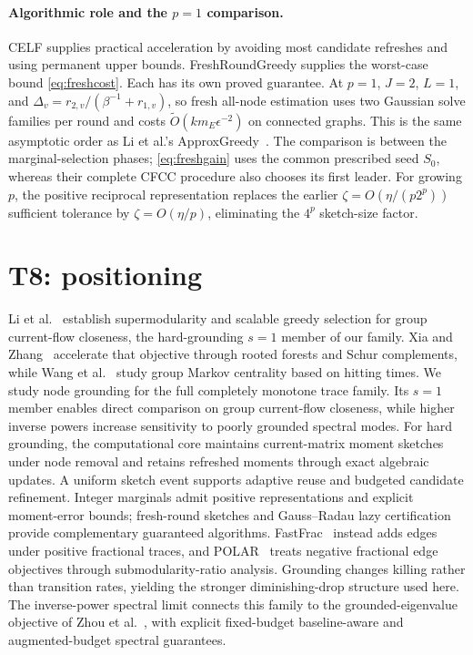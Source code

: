 \documentclass[11pt]{article}
\begin{document}
\paragraph{Algorithmic role and the $p=1$ comparison.}
CELF supplies practical acceleration by avoiding most candidate
refreshes and using permanent upper bounds. FreshRoundGreedy
supplies the worst-case bound \eqref{eq:freshcost}. Each has its
own proved guarantee. At $p=1$, $J=2$, $L=1$, and
$\Delta_v=r_{2,v}/(\beta^{-1}+r_{1,v})$, so fresh all-node
estimation uses two Gaussian solve families per round and costs
$\widetilde O(km_E\epsilon^{-2})$ on connected graphs. This is
the same asymptotic order as Li et al.'s ApproxGreedy~\cite{li2019}.
The comparison is between the marginal-selection phases;
\eqref{eq:freshgain} uses the common prescribed seed $S_0$,
whereas their complete CFCC procedure also chooses its first leader.
For growing $p$, the positive reciprocal representation replaces
the earlier $\zeta=O(\eta/(p2^p))$ sufficient tolerance by
$\zeta=O(\eta/p)$, eliminating the $4^p$ sketch-size factor.

\section{T8: positioning}
Li et al.~\cite{li2019} establish supermodularity and scalable greedy
selection for group current-flow closeness, the hard-grounding
$s=1$ member of our family. Xia and Zhang~\cite{xia2025} accelerate
that objective through rooted forests and Schur complements, while
Wang et al.~\cite{wang2026} study group Markov centrality based on
hitting times. We study node grounding for the full completely
monotone trace family. Its $s=1$ member enables direct comparison
on group current-flow closeness, while higher inverse powers
increase sensitivity to poorly grounded spectral modes.
For hard grounding, the computational core maintains current-matrix
moment sketches under node removal and retains refreshed moments
through exact algebraic updates. A uniform sketch event supports
adaptive reuse and budgeted candidate refinement. Integer marginals
admit positive representations and explicit moment-error bounds;
fresh-round sketches and Gauss--Radau lazy certification provide
complementary guaranteed algorithms. FastFrac~\cite{fastfrac}
instead adds edges
under positive fractional traces, and POLAR~\cite{polar} treats
negative fractional edge objectives through submodularity-ratio
analysis. Grounding changes killing rather than transition rates,
yielding the stronger diminishing-drop structure used here.
The inverse-power spectral limit connects this family to the
grounded-eigenvalue objective of Zhou et al.~\cite{zhou2023}, with
explicit fixed-budget baseline-aware and augmented-budget spectral
guarantees.
\end{document}

